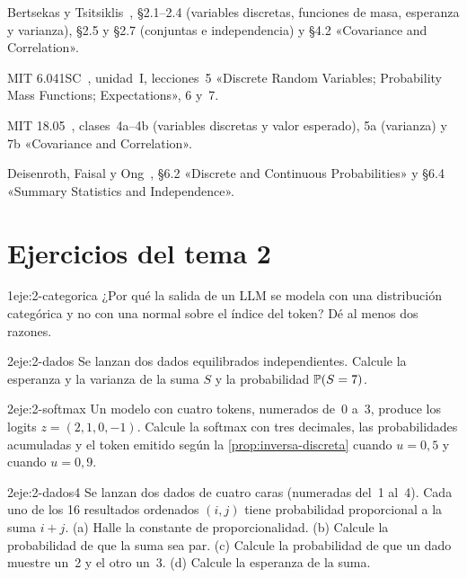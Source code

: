 \begin{lecturas}
\item Bertsekas y Tsitsiklis~\cite{bt}, §2.1–2.4 (variables discretas, funciones de masa, esperanza y varianza), §2.5 y §2.7 (conjuntas e independencia) y §4.2 «Covariance and Correlation».
\item MIT 6.041SC~\cite{mit6041}, unidad~I, lecciones~5 «Discrete Random Variables; Probability Mass Functions; Expectations», 6 y~7.
\item MIT 18.05~\cite{mit1805}, clases~4a–4b (variables discretas y valor esperado), 5a (varianza) y 7b «Covariance and Correlation».
\item Deisenroth, Faisal y Ong~\cite{mml}, §6.2 «Discrete and Continuous Probabilities» y §6.4 «Summary Statistics and Independence».
\end{lecturas}

\section*{Ejercicios del tema 2}

\begin{ejercicio}{1}{eje:2-categorica}
¿Por qué la salida de un LLM se modela con una distribución categórica y no con una normal sobre el índice del token? Dé al menos dos razones.
\end{ejercicio}

\begin{ejercicio}{2}{eje:2-dados}
Se lanzan dos dados equilibrados independientes. Calcule la esperanza y la varianza de la suma $S$ y la probabilidad $\mathbb{P}(S=7)$.
\end{ejercicio}

\begin{ejercicio}{2}{eje:2-softmax}
Un modelo con cuatro tokens, numerados de~0 a~3, produce los logits $z=(2,1,0,-1)$. Calcule la softmax con tres decimales, las probabilidades acumuladas y el token emitido según la \cref{prop:inversa-discreta} cuando $u=0{,}5$ y cuando $u=0{,}9$.
\end{ejercicio}

\begin{ejercicio}{2}{eje:2-dados4}
Se lanzan dos dados de cuatro caras (numeradas del~1 al~4). Cada uno de los 16 resultados ordenados $(i,j)$ tiene probabilidad proporcional a la suma $i+j$. (a) Halle la constante de proporcionalidad. (b) Calcule la probabilidad de que la suma sea par. (c) Calcule la probabilidad de que un dado muestre un~2 y el otro un~3. (d) Calcule la esperanza de la suma.
\end{ejercicio}

